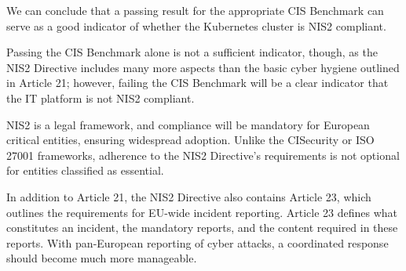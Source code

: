 We can conclude that a passing result for the appropriate CIS Benchmark can serve as a good indicator of whether the Kubernetes cluster is NIS2 compliant.

Passing the CIS Benchmark alone is not a sufficient indicator, though, as the NIS2 Directive includes many more aspects than the basic cyber hygiene outlined in Article 21; however, failing the CIS Benchmark will be a clear indicator that the IT platform is not NIS2 compliant.

NIS2 is a legal framework, and compliance will be mandatory for European critical entities, ensuring widespread adoption. Unlike the CISecurity or ISO 27001 frameworks, adherence to the NIS2 Directive's requirements is not optional for entities classified as essential.

In addition to Article 21, the NIS2 Directive also contains Article 23, which outlines the requirements for EU-wide incident reporting. Article 23 defines what constitutes an incident, the mandatory reports, and the content required in these reports. With pan-European reporting of cyber attacks, a coordinated response should become much more manageable.
